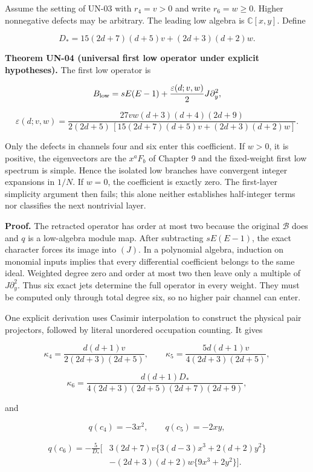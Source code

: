 Assume the setting of UN-03 with \(r_4=v>0\) and write \(r_6=w\geq0\). Higher nonnegative defects may be arbitrary. The leading low algebra is \(\mathbb C[x,y]\). Define

\[
D_*=15(2d+7)(d+5)v+(2d+3)(d+2)w.
\]

\textbf{Theorem UN-04 (universal first low operator under explicit hypotheses).} The first low operator is

\[
B_{\rm low}
=sE(E-1)+\frac{\varepsilon(d;v,w)}2J\partial_y^2,
\]

\[
\varepsilon(d;v,w)=
\frac{27vw(d+3)(d+4)(2d+9)}
{2(2d+5)\,[15(2d+7)(d+5)v+(2d+3)(d+2)w]}.
\]

Only the defects in channels four and six enter this coefficient. If \(w>0\), it is positive, the eigenvectors are the \(x^aF_b\) of Chapter 9 and the fixed-weight first low spectrum is simple. Hence the isolated low branches have convergent integer expansions in \(1/N\). If \(w=0\), the coefficient is exactly zero. The first-layer simplicity argument then fails; this alone neither establishes half-integer terms nor classifies the next nontrivial layer.

\textbf{Proof.} The retracted operator has order at most two because the original \(\mathscr B\) does and \(q\) is a low-algebra module map. After subtracting \(sE(E-1)\), the exact character forces its image into \((J)\). In a polynomial algebra, induction on monomial inputs implies that every differential coefficient belongs to the same ideal. Weighted degree zero and order at most two then leave only a multiple of \(J\partial_y^2\). Thus six exact jets determine the full operator in every weight. They must be computed only through total degree six, so no higher pair channel can enter.

One explicit derivation uses Casimir interpolation to construct the physical pair projectors, followed by literal unordered occupation counting. It gives

\[
\kappa_4=\frac{d(d+1)v}{2(2d+3)(2d+5)},\qquad
\kappa_5=\frac{5d(d+1)v}{4(2d+3)(2d+5)},
\]

\[
\kappa_6=
\frac{d(d+1)D_*}{4(2d+3)(2d+5)(2d+7)(2d+9)},
\]

and

\[
q(c_4)=-3x^2,\qquad q(c_5)=-2xy,
\]

\[
\begin{aligned}
q(c_6)=-\frac5{D_*}\big[
&3(2d+7)v\{3(d-3)x^3+2(d+2)y^2\}\\
&-(2d+3)(d+2)w\{9x^3+2y^2\}\big].
\end{aligned}
\]

